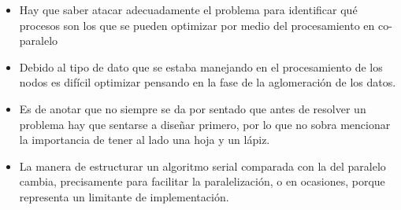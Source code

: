 \documentclass[fleqn,10pt]{SelfArx} %
\begin{document}
\begin{itemize}
	\item Hay que saber atacar adecuadamente el problema para identificar qué procesos son los que se pueden optimizar por medio del procesamiento en co-paralelo
	\item Debido al tipo de dato que se estaba manejando en el procesamiento de los nodos es difícil optimizar pensando en la fase de la aglomeración de los datos.
	\item Es de anotar que no siempre se da por sentado que antes de resolver un problema hay que sentarse a diseñar primero, por lo que no sobra mencionar la importancia de tener al lado una hoja y un lápiz.
	\item La manera de estructurar un algoritmo serial comparada con la del paralelo cambia, precisamente para facilitar la paralelización, o en ocasiones, porque representa un limitante de implementación.
\end{itemize}

\end{document}
